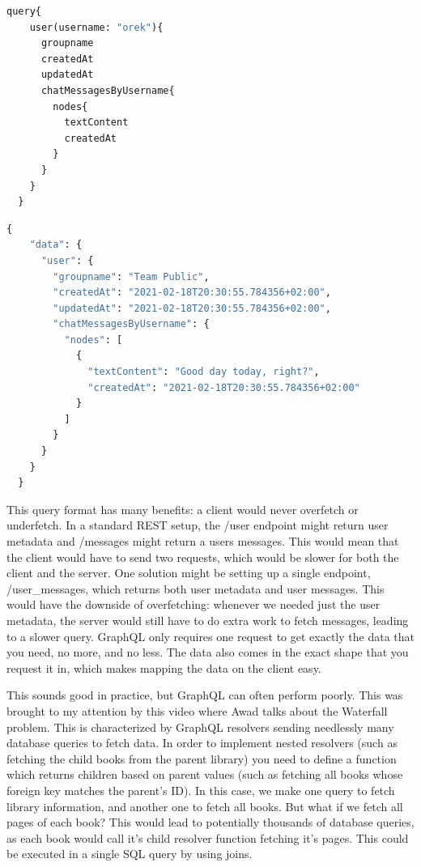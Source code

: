 \documentclass{l4proj}
\begin{document}
\begin{lstlisting}[language=python, caption={An example GraphQL query fetching information about user "orek" and their messages }, label=lst:callahan]
  query{
    user(username: "orek"){
      groupname
      createdAt
      updatedAt
      chatMessagesByUsername{
        nodes{
          textContent
          createdAt
        }
      }
    }
  }
\end{lstlisting}

\begin{lstlisting}[language=python, caption={Server response to the above query}, label=lst:callahan]
  {
    "data": {
      "user": {
        "groupname": "Team Public",
        "createdAt": "2021-02-18T20:30:55.784356+02:00",
        "updatedAt": "2021-02-18T20:30:55.784356+02:00",
        "chatMessagesByUsername": {
          "nodes": [
            {
              "textContent": "Good day today, right?",
              "createdAt": "2021-02-18T20:30:55.784356+02:00"
            }
          ]
        }
      }
    }
  }
\end{lstlisting}
This query format has many benefits: a client would never overfetch or underfetch. In a standard REST setup, the /user endpoint might return user metadata and /messages might return a users messages. This would mean that the client would have to send two requests, which would be slower for both the client and the server. One solution might be setting up a single endpoint, /user\_messages, which returns both user metadata and user messages. This would have the downside of overfetching: whenever we needed just the user metadata, the server would still have to do extra work to fetch messages, leading to a slower query. GraphQL only requires one request to get exactly the data that you need, no more, and no less. The data also comes in the exact shape that you request it in, which makes mapping the data on the client easy. 

This sounds good in practice, but GraphQL can often perform poorly. This was brought to my attention by this video \cite{Ben Awad} where Awad talks about the Waterfall problem. This is characterized by GraphQL resolvers sending needlessly many database queries to fetch data. In order to implement nested resolvers (such as fetching the child books from the parent library) you need to define a function which returns children based on parent values (such as fetching all books whose foreign key matches the parent's ID). In this case, we make one query to fetch library information, and another one to fetch all books. But what if we fetch all pages of each book? This would lead to potentially thousands of database queries, as each book would call it's child resolver function fetching it's pages. This could be executed in a single SQL query by using joins.
\end{document}
